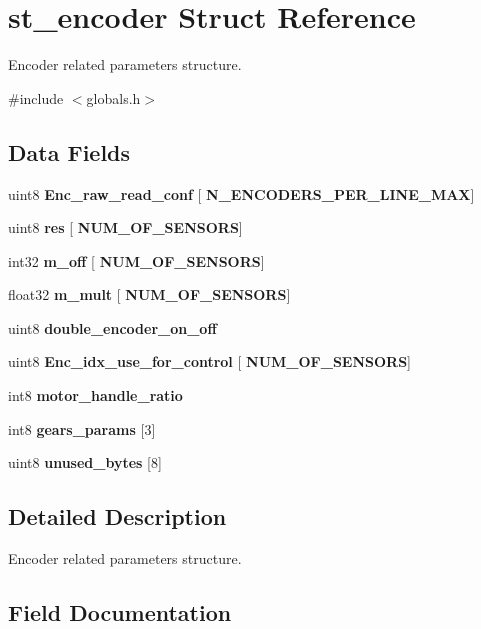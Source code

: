 \section{st\+\_\+encoder Struct Reference}
\label{structst__encoder}


Encoder related parameters structure.  




{\ttfamily \#include $<$globals.\+h$>$}

\subsection*{Data Fields}
\begin{DoxyCompactItemize}
\item 
uint8 \textbf{ Enc\+\_\+raw\+\_\+read\+\_\+conf} [\textbf{ N\+\_\+\+E\+N\+C\+O\+D\+E\+R\+S\+\_\+\+P\+E\+R\+\_\+\+L\+I\+N\+E\+\_\+\+M\+AX}]
\item 
uint8 \textbf{ res} [\textbf{ N\+U\+M\+\_\+\+O\+F\+\_\+\+S\+E\+N\+S\+O\+RS}]
\item 
int32 \textbf{ m\+\_\+off} [\textbf{ N\+U\+M\+\_\+\+O\+F\+\_\+\+S\+E\+N\+S\+O\+RS}]
\item 
float32 \textbf{ m\+\_\+mult} [\textbf{ N\+U\+M\+\_\+\+O\+F\+\_\+\+S\+E\+N\+S\+O\+RS}]
\item 
uint8 \textbf{ double\+\_\+encoder\+\_\+on\+\_\+off}
\item 
uint8 \textbf{ Enc\+\_\+idx\+\_\+use\+\_\+for\+\_\+control} [\textbf{ N\+U\+M\+\_\+\+O\+F\+\_\+\+S\+E\+N\+S\+O\+RS}]
\item 
int8 \textbf{ motor\+\_\+handle\+\_\+ratio}
\item 
int8 \textbf{ gears\+\_\+params} [3]
\item 
uint8 \textbf{ unused\+\_\+bytes} [8]
\end{DoxyCompactItemize}


\subsection{Detailed Description}
Encoder related parameters structure. 



\subsection{Field Documentation}
\mbox{\label{structst__encoder_a3d5832272cab9dc9f831471a9634b43e}} 
